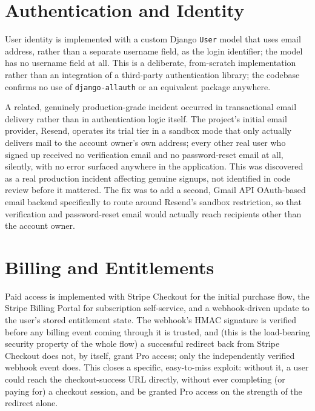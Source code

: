 \section{Authentication and Identity}
\label{sec:impl-auth}

User identity is implemented with a custom Django \texttt{User} model that uses email address, rather than a separate username field, as the login identifier; the model has no username field at all. This is a deliberate, from-scratch implementation rather than an integration of a third-party authentication library; the codebase confirms no use of \texttt{django-allauth} or an equivalent package anywhere.

A related, genuinely production-grade incident occurred in transactional email delivery rather than in authentication logic itself. The project's initial email provider, Resend, operates its trial tier in a sandbox mode that only actually delivers mail to the account owner's own address; every other real user who signed up received no verification email and no password-reset email at all, silently, with no error surfaced anywhere in the application. This was discovered as a real production incident affecting genuine signups, not identified in code review before it mattered. The fix was to add a second, Gmail API OAuth-based email backend specifically to route around Resend's sandbox restriction, so that verification and password-reset email would actually reach recipients other than the account owner.

\section{Billing and Entitlements}
\label{sec:impl-billing}

Paid access is implemented with Stripe Checkout for the initial purchase flow, the Stripe Billing Portal for subscription self-service, and a webhook-driven update to the user's stored entitlement state. The webhook's HMAC signature is verified before any billing event coming through it is trusted, and (this is the load-bearing security property of the whole flow) a successful redirect back from Stripe Checkout does not, by itself, grant Pro access; only the independently verified webhook event does. This closes a specific, easy-to-miss exploit: without it, a user could reach the checkout-success URL directly, without ever completing (or paying for) a checkout session, and be granted Pro access on the strength of the redirect alone.

